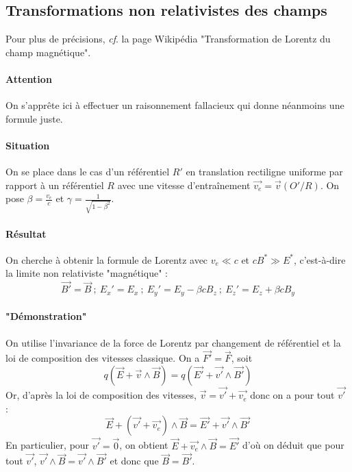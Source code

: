 \documentclass[french]{book}
\theoremstyle{plain}
\theoremstyle{definition}
\theoremstyle{remark}
\newcommand{\st}{^*}
\begin{document}
\subsection{Transformations non relativistes des champs}
Pour plus de précisions, \textit{cf}. la page Wikipédia "Transformation de Lorentz du champ magnétique".
\paragraph{Attention} On s'apprête ici à effectuer un raisonnement fallacieux qui donne néanmoins une formule juste.
\paragraph{Situation} On se place dans le cas d'un référentiel $R'$ en translation rectiligne uniforme par rapport à un référentiel $R$ avec une vitesse d'entraînement $\overrightarrow{v_e}=\overrightarrow{v}(O'/R)$. On pose $\displaystyle\beta=\frac{v_e}{c}$ et $\displaystyle\gamma=\frac{1}{\sqrt{1-\beta^2}}$.
\paragraph{Résultat} On cherche à obtenir la formule de Lorentz avec $v_e\ll c$ et $cB\st\gg E\st$, c'est-à-dire la limite non relativiste "magnétique" : $$\overrightarrow{B'}=\overrightarrow{B} \ ; \ E_x'=E_x \ ; \ E_y'=E_y-\beta cB_z \ ; \ E_z'=E_z+\beta cB_y$$
\paragraph{"Démonstration"} On utilise l'invariance de la force de Lorentz par changement de référentiel et la loi de composition des vitesses classique. On a $\overrightarrow{F'}=\overrightarrow{F}$, soit $$q\left(\overrightarrow{E}+\overrightarrow{v}\wedge\overrightarrow{B}\right)=q\left(\overrightarrow{E'}+\overrightarrow{v'}\wedge\overrightarrow{B'}\right)$$ Or, d'après la loi de composition des vitesses, $\overrightarrow{v}=\overrightarrow{v'}+\overrightarrow{v_e}$ donc on a pour tout $\overrightarrow{v'}$ : $$\overrightarrow{E}+\left(\overrightarrow{v'}+\overrightarrow{v_e}\right)\wedge\overrightarrow{B}=\overrightarrow{E'}+\overrightarrow{v'}\wedge\overrightarrow{B'}$$ En particulier, pour $\overrightarrow{v'}=\overrightarrow{0}$, on obtient $\overrightarrow{E}+\overrightarrow{v_e}\wedge\overrightarrow{B}=\overrightarrow{E'}$ d'où on déduit que pour tout $\overrightarrow{v'}$, $\overrightarrow{v'}\wedge\overrightarrow{B}=\overrightarrow{v'}\wedge\overrightarrow{B'}$ et donc que $\overrightarrow{B}=\overrightarrow{B'}$.
\end{document}
